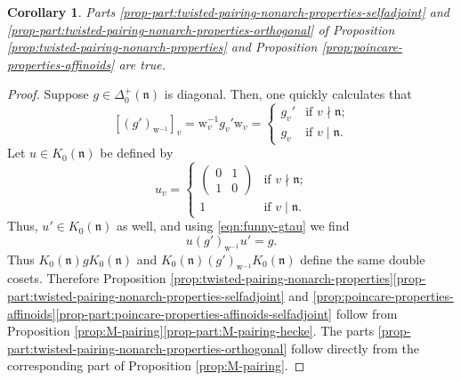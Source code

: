 \documentclass[10pt, twoside]{amsart}
\theoremstyle{plain}
\newtheorem{corollary}[theorem]{Corollary}
\theoremstyle{definition}
\theoremstyle{remark}
\numberwithin{equation}{subsection}
\def\gn{\mathfrak n}
\newcommand{\mat}[4]{\begin{pmatrix}#1&#2\\#3&#4\end{pmatrix}}
\begin{document}
\begin{appendix}
\begin{corollary}\label{corollary:app-maintext}
Parts \ref{prop-part:twisted-pairing-nonarch-properties-selfadjoint} and \ref{prop-part:twisted-pairing-nonarch-properties-orthogonal} of Proposition \ref{prop:twisted-pairing-nonarch-properties} and Proposition \ref{prop:poincare-properties-affinoids} are true.
\end{corollary}
\begin{proof}
Suppose $g \in \Delta_0^+(\gn)$ is diagonal. Then, one quickly calculates that
\begin{equation}\label{eqn:funny-gtau}
\left[(g')_{{{ \boldsymbol{\mathrm{w}}}}^{-1}}\right]_v = {{ \boldsymbol{\mathrm{w}}}}_v^{-1}g_v'{{ \boldsymbol{\mathrm{w}}}}_v = \begin{cases}
g_v' & \text{if $v \nmid \gn$;}\\
g_v & \text{if $v \mid \gn$.}
\end{cases}
\end{equation}
Let $u \in K_0(\gn)$ be defined by
$$
u_v = \begin{cases}
\mat 0110 & \text{if $v \nmid \gn$;}\\
1 & \text{if $v \mid \gn$}.
\end{cases}
$$
Thus, $u' \in K_0(\gn)$ as well, and using \eqref{eqn:funny-gtau} we find
$$
u(g')_{{{ \boldsymbol{\mathrm{w}}}}^{-1}}u' = g.
$$
Thus $K_0(\gn) g K_0(\gn)$ and $K_0(\gn)(g')_{{{ \boldsymbol{\mathrm{w}}}}^{-1}} K_0(\gn)$ define the same double cosets.
Therefore Proposition \ref{prop:twisted-pairing-nonarch-properties}\ref{prop-part:twisted-pairing-nonarch-properties-selfadjoint} and \ref{prop:poincare-properties-affinoids}\ref{prop-part:poincare-properties-affinoids-selfadjoint} follow from Proposition \ref{prop:M-pairing}\ref{prop-part:M-pairing-hecke}. The parts \ref{prop-part:twisted-pairing-nonarch-properties-orthogonal} follow directly from the corresponding part of Proposition \ref{prop:M-pairing}.
\end{proof}

\end{appendix}



\end{document}
